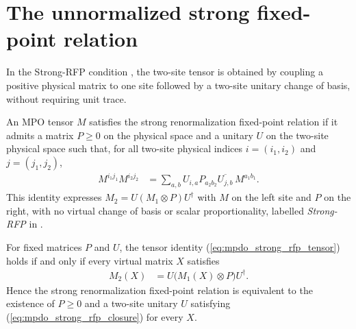 \section{The unnormalized strong fixed-point relation}

In the Strong-RFP condition \cite[Appendix~D, lines~2109--2116]{Cirac2016MPDO_arXiv},
the two-site tensor is obtained by coupling a positive physical matrix to one
site followed by a two-site unitary change of basis, without requiring unit
trace.

\begin{definition}
    \label{def:mpdo_strong_rfp}
    \leanok
    An MPO tensor $M$ satisfies the strong renormalization fixed-point relation
    if it admits a matrix $P\geq0$ on the physical space and a unitary $U$ on
    the two-site physical space such that, for all two-site physical indices
    $i=(i_1,i_2)$ and $j=(j_1,j_2)$,
    \begin{align}
        M^{i_1j_1}M^{i_2j_2}
         & =\sum_{a,b}
        U_{i,a}P_{a_2b_2}\overline{U_{j,b}}\,M^{a_1b_1}.
        \label{eq:mpdo_strong_rfp_tensor}
    \end{align}
    This identity expresses $M_2=U(M_1\otimes P)U^\dagger$ with $M$ on the left
    site and $P$ on the right, with no virtual change of basis or scalar
    proportionality, labelled \emph{Strong-RFP} in
    \cite[Appendix~D, lines~2109--2113]{Cirac2016MPDO_arXiv}.
\end{definition}

\begin{lemma}
    \label{thm:mpdo_strong_rfp_phys_close}
    \leanok
    For fixed matrices $P$ and $U$, the tensor identity
    (\ref{eq:mpdo_strong_rfp_tensor}) holds if and only if every virtual
    matrix $X$ satisfies
    \begin{align}
        M_2(X)
         & =U\bigl(M_1(X)\otimes P\bigr)U^\dagger.
        \label{eq:mpdo_strong_rfp_closure}
    \end{align}
    Hence the strong renormalization fixed-point relation is equivalent to the
    existence of $P\geq0$ and a two-site unitary $U$ satisfying
    (\ref{eq:mpdo_strong_rfp_closure}) for every $X$.
\end{lemma}

